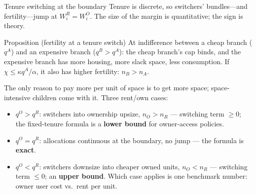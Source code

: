 \documentclass[11pt,aspectratio=169]{beamer}
\newcommand{\1}{\mathbf 1}
\begin{document}
\begin{frame}{Tenure switching at the boundary}
\small
Tenure is discrete, so switchers' bundles---and fertility---jump at $W_i^R=W_i^O$. The size of the margin is quantitative; the sign is theory.

\begin{block}{Proposition (fertility at a tenure switch)}
At indifference between a cheap branch ($q^A$) and an expensive branch ($q^B>q^A$): the cheap branch's cap binds, and the expensive branch has more housing, more slack space, less consumption. If $\chi\le\kappa q^A/\alpha$, it also has higher fertility: $n_B>n_A$.
\end{block}
The only reason to pay more per unit of space is to get more space; space-intensive children come with it. Three rent/own cases:
\begin{itemize}\setlength{\itemsep}{0.3em}
  \item $q^O>q^R$: switchers into ownership upsize, $n_O>n_R$ --- switching term $\ge0$; the fixed-tenure formula is a \textbf{lower bound} for owner-access policies.
  \item $q^O=q^R$: allocations continuous at the boundary, no jump --- the formula is \textbf{exact}.
  \item $q^O<q^R$: switchers downsize into cheaper owned units, $n_O<n_R$ --- switching term $\le0$; an \textbf{upper bound}. Which case applies is one benchmark number: owner user cost vs.\ rent per unit.
\end{itemize}
\end{frame}
\end{document}
